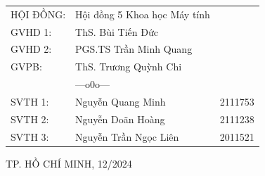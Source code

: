 \begin{titlepage}
    \vspace{1.5cm}
    \begin{table}[h!]
        \raggedleft
        \bfseries
        \renewcommand{\arraystretch}{1.2}
        \fontsize{15pt}{15pt}\selectfont
        \begin{tabular}{llc}
            HỘI ĐỒNG:   & Hội đồng 5 Khoa học Máy tính &\\
            GVHD 1:     & ThS. Bùi Tiến Đức \\
            GVHD 2:     & PGS.TS Trần Minh Quang \\
            GVPB:       & ThS. Trương Quỳnh Chi & \\
            
            & \quad\quad---o0o--- &  \\
            SVTH 1:     & Nguyễn Quang Minh      & 2111753 \\
            SVTH 2:     & Nguyễn Doãn Hoàng      & 2111238 \\
            SVTH 3:     & Nguyễn Trần Ngọc Liên  & 2011521 \\
        \end{tabular}
    \end{table}
    
    \begin{center}
        \vspace{0.5cm}\fontsize{14pt}{9pt}\selectfont
        
        TP. HỒ CHÍ MINH, 12/2024
    \end{center}
\end{titlepage}
